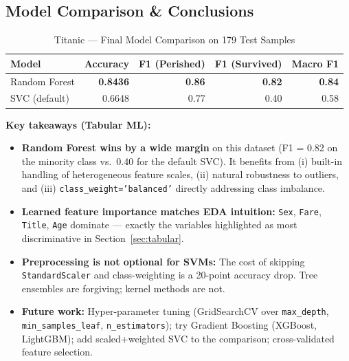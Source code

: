 \subsection{Model Comparison \& Conclusions}

\begin{table}[H]
\centering
\caption{Titanic --- Final Model Comparison on 179 Test Samples}
\label{tab:a2_tab_cmp}
\begin{tabular}{lrrrr}
\hline
\textbf{Model} & \textbf{Accuracy} & \textbf{F1 (Perished)} & \textbf{F1 (Survived)} & \textbf{Macro F1} \\
\hline
Random Forest  & \textbf{0.8436} & \textbf{0.86} & \textbf{0.82} & \textbf{0.84} \\
SVC (default)  & 0.6648 & 0.77 & 0.40 & 0.58 \\
\hline
\end{tabular}
\end{table}

\begin{importantbox}
\textbf{Key takeaways (Tabular ML):}
\begin{itemize}
    \item \textbf{Random Forest wins by a wide margin} on this dataset (F1 = 0.82 on the minority class vs.\ 0.40 for the default SVC). It benefits from (i) built-in handling of heterogeneous feature scales, (ii) natural robustness to outliers, and (iii) \texttt{class\_weight='balanced'} directly addressing class imbalance.
    \item \textbf{Learned feature importance matches EDA intuition:} \texttt{Sex}, \texttt{Fare}, \texttt{Title}, \texttt{Age} dominate --- exactly the variables highlighted as most discriminative in Section~\ref{sec:tabular}.
    \item \textbf{Preprocessing is not optional for SVMs:} The cost of skipping \texttt{StandardScaler} and class-weighting is a 20-point accuracy drop. Tree ensembles are forgiving; kernel methods are not.
    \item \textbf{Future work:} Hyper-parameter tuning (GridSearchCV over \texttt{max\_depth}, \texttt{min\_samples\_leaf}, \texttt{n\_estimators}); try Gradient Boosting (XGBoost, LightGBM); add scaled+weighted SVC to the comparison; cross-validated feature selection.
\end{itemize}
\end{importantbox}
